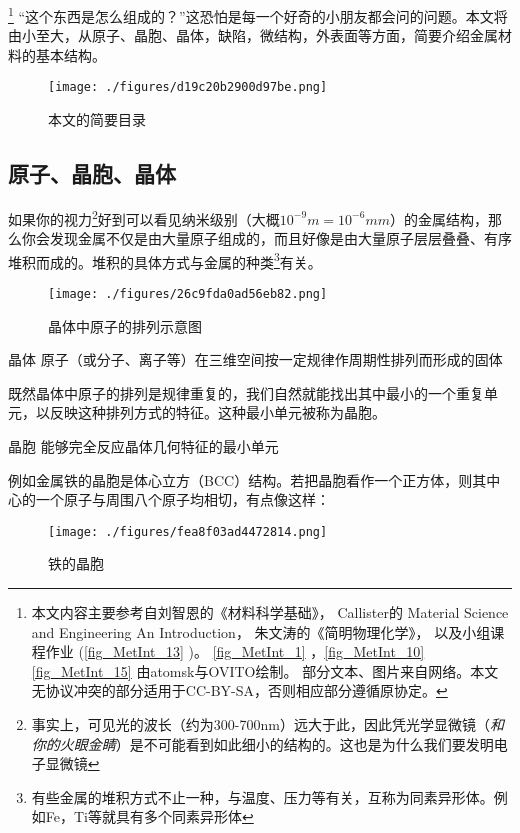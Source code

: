 
\footnote{本文内容主要参考自刘智恩的《材料科学基础》，
Callister的 Material Science and Engineering An Introduction，
朱文涛的《简明物理化学》，
以及小组课程作业
(\autoref{fig_MetInt_13} )。 
\autoref{fig_MetInt_1} ，\autoref{fig_MetInt_10} \autoref{fig_MetInt_15} 由atomsk与OVITO绘制。
部分文本、图片来自网络。本文无协议冲突的部分适用于CC-BY-SA，否则相应部分遵循原协定。} “这个东西是怎么组成的？”这恐怕是每一个好奇的小朋友都会问的问题。本文将由小至大，从原子、晶胞、晶体，缺陷，微结构，外表面等方面，简要介绍金属材料的基本结构。
\begin{figure}[ht]
\centering
\texttt{[image: ./figures/d19c20b2900d97be.png]}
\caption{本文的简要目录} \label{fig_MetInt_18}
\end{figure}

\subsection{原子、晶胞、晶体}
如果你的视力\footnote{事实上，可见光的波长（约为300-700nm）远大于此，因此凭光学显微镜（\textsl{和你的火眼金睛}）是不可能看到如此细小的结构的。这也是为什么我们要发明电子显微镜}好到可以看见纳米级别（大概$10^{-9}m =10^{-6} mm$）的金属结构，那么你会发现金属不仅是由大量原子组成的，而且好像是由大量原子层层叠叠、有序堆积而成的。堆积的具体方式与金属的种类\footnote{有些金属的堆积方式不止一种，与温度、压力等有关，互称为同素异形体。例如Fe，Ti等就具有多个同素异形体}有关。

\begin{figure}[ht]
\centering
\texttt{[image: ./figures/26c9fda0ad56eb82.png]}
\caption{晶体中原子的排列示意图} \label{fig_MetInt_1}
\end{figure}

\begin{definition}{晶体}
原子（或分子、离子等）在三维空间按一定规律作周期性排列而形成的固体
\end{definition}

既然晶体中原子的排列是规律重复的，我们自然就能找出其中最小的一个重复单元，以反映这种排列方式的特征。这种最小单元被称为晶胞。
\begin{definition}{晶胞}
能够完全反应晶体几何特征的最小单元
\end{definition}
例如金属铁的晶胞是体心立方（BCC）结构。若把晶胞看作一个正方体，则其中心的一个原子与周围八个原子均相切，有点像这样：
\begin{figure}[ht]
\centering
\texttt{[image: ./figures/fea8f03ad4472814.png]}
\caption{铁的晶胞} \label{fig_MetInt_2}
\end{figure}

